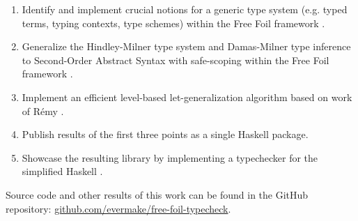 \begin{enumerate}
  \item Identify and implement crucial notions for a generic type system (e.g. typed terms, typing contexts, type schemes) within the Free Foil framework \cite{FreeFoil}.
  \item Generalize the Hindley-Milner type system \cite{Hindley1969PrincipalTypeScheme} \cite{Milner1978_TypePolymorphism} and Damas-Milner type inference \cite{DamasMilner1982_TypeSchemes} to Second-Order Abstract Syntax with safe-scoping within the Free Foil framework \cite{FreeFoil}.
  \item Implement an efficient level-based let-generalization algorithm based on work of Rémy \cite{Remy1992_SortedEqTheoryTypes}.
  \item Publish results of the first three points as a single Haskell package.
  \item Showcase the resulting library by implementing a typechecker for the simplified Haskell \cite{Jones1999_TypingHaskell}.
\end{enumerate}

Source code and other results of this work can be found in the GitHub repository: \href{https://github.com/evermake/free-foil-typecheck}{github.com/evermake/free-foil-typecheck}.
